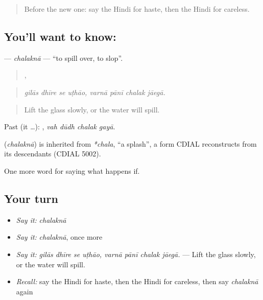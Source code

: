 \label{lesson:HI-C382-chalakna}



\begin{quote}
Before the new one: say the Hindi for haste, then the Hindi for careless.
\end{quote}

\subsection*{You'll want to know: }
\textbf{} — \emph{chalaknā} — \textquotedblleft{}to spill over, to slop\textquotedblright{}.

\begin{quote}
   ,    
\end{quote}

\begin{quote}
\emph{gilās dhīre se uṭhāo, varnā pānī chalak jāegā.}
\end{quote}

\begin{quote}
Lift the glass slowly, or the water will spill.
\end{quote}

Past (it …):    , \emph{vah dūdh chalak gayā}.

\begin{cousinweb}
\textbf{} (\emph{chalaknā}) is inherited from \emph{*chala}, \textquotedblleft{}a splash\textquotedblright{}, a form CDIAL reconstructs from its descendants (CDIAL 5002).
\end{cousinweb}

\begin{grammarlens}[title={What you've built}]
One more word for saying what happens if.
\end{grammarlens}

\subsection*{Your turn}
\begin{itemize}
\raggedright
  \item \emph{Say it:} \emph{chalaknā}
  \item \emph{Say it:} \emph{chalaknā}, once more
  \item \emph{Say it:} \emph{gilās dhīre se uṭhāo, varnā pānī chalak jāegā.} — Lift the glass slowly, or the water will spill.
  \item \emph{Recall:} say the Hindi for haste, then the Hindi for careless, then say \emph{chalaknā} again
\end{itemize}

